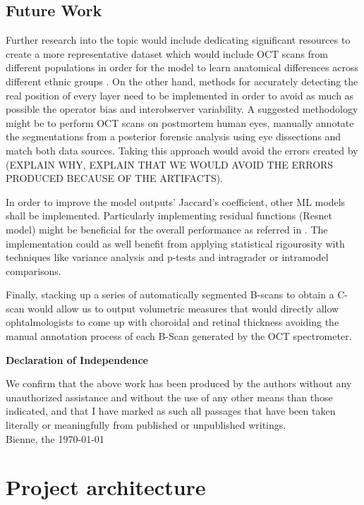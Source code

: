 \documentclass[12pt,a4paper]{scrartcl}
\newcommand*\savedtocdepth{}
\edef\savedtocdepth{\the\value{tocdepth}}%
\let\originalappendix\appendix
\renewcommand\appendix{%
  \originalappendix
  \cleardoublepage
  \addcontentsline{toc}{chapter}{\appendixname}%
  \addtocontents{toc}{\protect\value{tocdepth}=-1}%
  \addtocontents{atoc}{\protect\value{tocdepth}=\savedtocdepth}%
}
\begin{document}
\section{Future Work}

Further research into the topic would include dedicating significant resources to create a more representative dataset which would include OCT scans from different populations in order for the model to learn anatomical differences across different ethnic groups \cite{Consejo2020, Lin2009}. On the other hand, methods for accurately detecting the real position of every layer need to be implemented in order to avoid as much as possible the operator bias and interobserver variability. A suggested methodology might be to perform OCT scans on postmortem human eyes, manually annotate the segmentations from a posterior forensic analysis using eye dissections \cite{IOVINO2017, Mcnabb2009, Nioi2019} and match both data sources. Taking this approach would avoid the errors created by  (EXPLAIN WHY, EXPLAIN THAT WE WOULD AVOID THE ERRORS PRODUCED BECAUSE OF THE ARTIFACTS).   

In order to improve the model outputs' Jaccard's coefficient, other ML models shall be implemented. Particularly implementing residual functions (Resnet model) might be beneficial for the overall performance as referred in \cite{He2015, Zheng2020}. The implementation could as well benefit from applying statistical rigourosity with techniques like variance analysis and p-tests and intragrader or intramodel comparisons. 

Finally, stacking up a series of automatically segmented B-scans to obtain a C-scan would allow us to output volumetric measures that would directly allow ophtalmologists to come up with choroidal and retinal thickness avoiding the manual annotation process of each B-Scan generated by the OCT spectrometer. 


\markboth{}{}

\newpage





\newpage
\thispagestyle{empty}
\markboth{}{}
  \normalsize
\begin{center}
\huge{\textbf{ Declaration of Independence}}\\[40mm]
\end{center}
\large
We confirm that the above work has been produced by the authors without any unauthorized assistance and without the use of any other means than those indicated, and that I have marked as such all passages that have been taken literally or meaningfully from published or unpublished writings.\\[50mm]
Bienne, the \today

\newpage
\blinddocument
\appendix
\chapter{Project architecture}

\blinddocument
\end{document}
